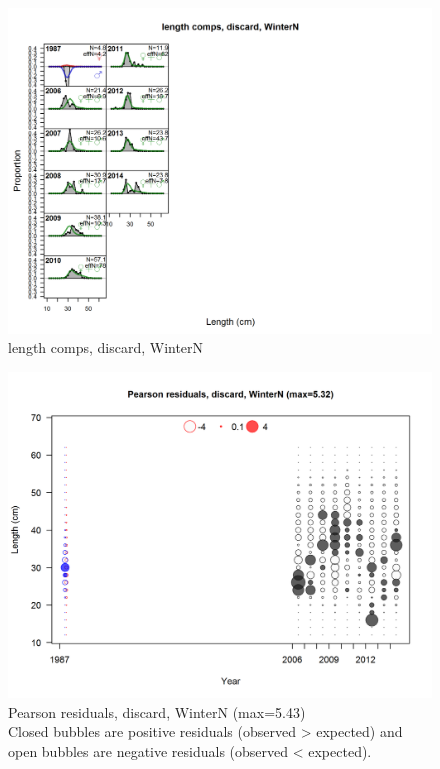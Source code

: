 \documentclass[12pt,]{article}
\begin{document}
\begin{figure}[htbp]
\centering
\includegraphics{./r4ss/plots_mod1/comp_lenfit_flt1mkt1.png}
\caption{length comps, discard, WinterN
\label{fig:mod1_6_comp_lenfit_flt1mkt1}}
\end{figure}

\begin{figure}[htbp]
\centering
\includegraphics{./r4ss/plots_mod1/comp_lenfit_residsflt1mkt1.png}
\caption{Pearson residuals, discard, WinterN (max=5.43)\\
Closed bubbles are positive residuals (observed \textgreater{} expected)
and open bubbles are negative residuals (observed \textless{} expected).
\label{fig:mod1_7_comp_lenfit_residsflt1mkt1}}
\end{figure}
\end{document}
